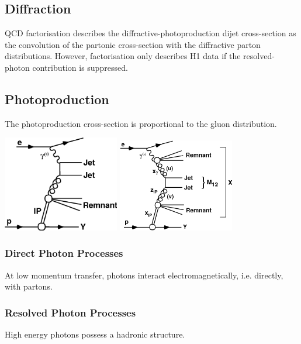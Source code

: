 \subsection{Diffraction}

QCD factorisation describes the diffractive-photoproduction dijet cross-section as the convolution of the partonic cross-section with the diffractive parton distributions. However, factorisation only describes H1 data if the resolved-photon contribution is suppressed. 

\subsection{Photoproduction}

The photoproduction cross-section is proportional to the gluon distribution.

\centerline{
\includegraphics[width=2in]{Chapter1/importfigs/fig1a.png}
\includegraphics[width=2in]{Chapter1/importfigs/fig1b.png}
}

\subsubsection{Direct Photon Processes}

At low momentum transfer, photons interact electromagnetically, i.e. directly, with partons. 

\subsubsection{Resolved Photon Processes}

High energy photons possess a hadronic structure. 